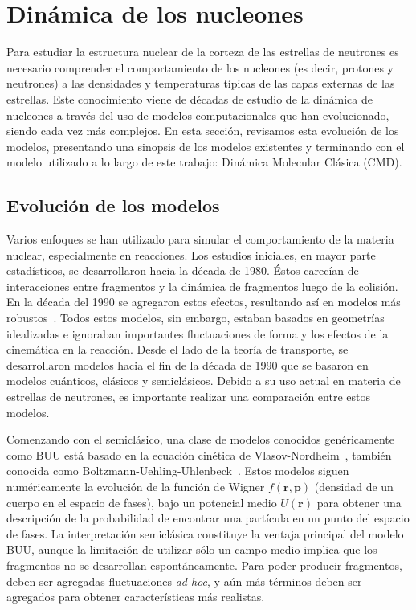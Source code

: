 \section{Dinámica de los nucleones}\label{sc:nucleon}
Para estudiar la estructura nuclear de la corteza de las estrellas de neutrones es necesario comprender el comportamiento de los nucleones (es decir, protones y neutrones) a las densidades y temperaturas típicas de las capas externas de las estrellas.
Este conocimiento viene de décadas de estudio de la dinámica de nucleones a través del uso de modelos computacionales que han evolucionado, siendo cada vez más complejos.
En esta sección, revisamos esta evolución de los modelos, presentando una sinopsis de los modelos existentes y terminando con el modelo utilizado a lo largo de este trabajo: Dinámica Molecular Clásica (CMD).

\subsection{Evolución de los modelos}
Varios enfoques se han utilizado para simular el comportamiento de la materia nuclear, especialmente en reacciones.
Los estudios iniciales, en mayor parte estadísticos, se desarrollaron hacia la década de 1980.
Éstos carecían de interacciones entre fragmentos y la dinámica de fragmentos luego de la colisión.
En la década del 1990 se agregaron estos efectos, resultando así en modelos más robustos~\cite{barz_cluster_1996}.
Todos estos modelos, sin embargo, estaban basados en geometrías idealizadas e ignoraban importantes fluctuaciones de forma y los efectos de la cinemática en la reacción.
Desde el lado de la teoría de transporte, se desarrollaron modelos hacia el fin de la década de 1990 que se basaron en modelos cuánticos, clásicos y semiclásicos.
Debido a su uso actual en materia de estrellas de neutrones, es importante realizar una comparación entre estos modelos.

Comenzando con el semiclásico, una clase de modelos conocidos genéricamente como BUU está basado en la ecuación cinética de Vlasov-Nordheim~\cite{nordheim_kinetic_1928}, también conocida como Boltzmann-Uehling-Uhlenbeck~\cite{uehling_transport_1933}.
Estos modelos siguen numéricamente la evolución de la función de Wigner $f(\mathbf{r},\mathbf{p})$ (densidad de un cuerpo en el espacio de fases), bajo un potencial medio $U(\mathbf{r})$ para obtener una descripción de la probabilidad de encontrar una partícula en un punto del espacio de fases.
La interpretación semiclásica constituye la ventaja principal del modelo BUU, aunque la limitación de utilizar sólo un campo medio implica que los fragmentos no se desarrollan espontáneamente.
Para poder producir fragmentos, deben ser agregadas fluctuaciones \emph{ad hoc}, y aún más términos deben ser agregados para obtener características más realistas.

